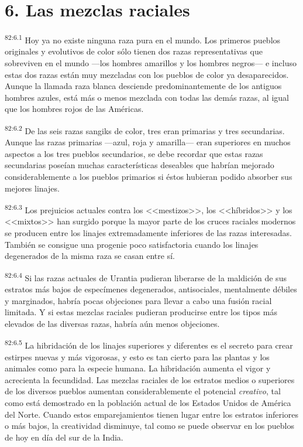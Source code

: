 \section*{6. Las mezclas raciales}
\par
\textsuperscript{82:6.1} Hoy ya no existe ninguna raza pura en el mundo. Los primeros pueblos originales y evolutivos de color sólo tienen dos razas representativas que sobreviven en el mundo ---los hombres amarillos y los hombres negros--- e incluso estas dos razas están muy mezcladas con los pueblos de color ya desaparecidos. Aunque la llamada raza blanca desciende predominantemente de los antiguos hombres azules, está más o menos mezclada con todas las demás razas, al igual que los hombres rojos de las Américas.

\par
\textsuperscript{82:6.2} De las seis razas sangiks de color, tres eran primarias y tres secundarias. Aunque las razas primarias ---azul, roja y amarilla--- eran superiores en muchos aspectos a los tres pueblos secundarios, se debe recordar que estas razas secundarias poseían muchas características deseables que habrían mejorado considerablemente a los pueblos primarios si éstos hubieran podido absorber sus mejores linajes.

\par
\textsuperscript{82:6.3} Los prejuicios actuales contra los <<mestizos>>, los <<híbridos>> y los <<mixtos>> han surgido porque la mayor parte de los cruces raciales modernos se producen entre los linajes extremadamente inferiores de las razas interesadas. También se consigue una progenie poco satisfactoria cuando los linajes degenerados de la misma raza se casan entre sí.

\par
\textsuperscript{82:6.4} Si las razas actuales de Urantia pudieran liberarse de la maldición de sus estratos más bajos de especímenes degenerados, antisociales, mentalmente débiles y marginados, habría pocas objeciones para llevar a cabo una fusión racial limitada. Y si estas mezclas raciales pudieran producirse entre los tipos más elevados de las diversas razas, habría aún menos objeciones.

\par
\textsuperscript{82:6.5} La hibridación de los linajes superiores y diferentes es el secreto para crear estirpes nuevas y más vigorosas, y esto es tan cierto para las plantas y los animales como para la especie humana. La hibridación aumenta el vigor y acrecienta la fecundidad. Las mezclas raciales de los estratos medios o superiores de los diversos pueblos aumentan considerablemente el potencial \textit{creativo}, tal como está demostrado en la población actual de los Estados Unidos de América del Norte. Cuando estos emparejamientos tienen lugar entre los estratos inferiores o más bajos, la creatividad disminuye, tal como se puede observar en los pueblos de hoy en día del sur de la India.

